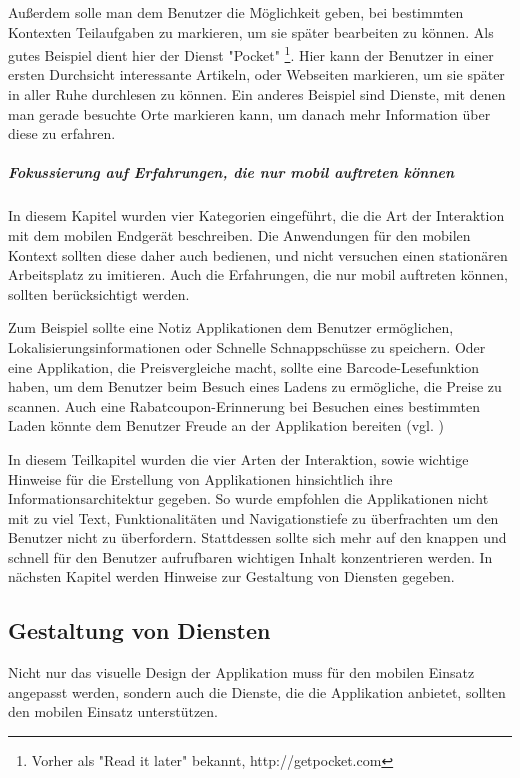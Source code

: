 Außerdem solle man dem Benutzer die Möglichkeit geben, bei bestimmten Kontexten Teilaufgaben zu markieren, um sie später bearbeiten zu können. Als gutes Beispiel dient hier der Dienst "Pocket" \footnote{Vorher als "Read it later" bekannt, http://getpocket.com }. Hier kann der Benutzer in einer ersten Durchsicht interessante Artikeln, oder Webseiten markieren, um sie später in aller Ruhe durchlesen zu können. Ein anderes Beispiel sind Dienste, mit denen man gerade besuchte Orte markieren kann, um danach mehr Information über diese zu erfahren.

\subparagraph{Fokussierung auf Erfahrungen, die nur mobil auftreten können} %
\label{subp:fokussiere_auf_erfahrungen_die_nur_mobil_auftreten_k_nnen}

In diesem Kapitel wurden vier Kategorien eingeführt, die die Art der Interaktion mit dem mobilen Endgerät beschreiben. Die Anwendungen für den mobilen Kontext sollten diese daher  auch bedienen, und nicht versuchen einen stationären Arbeitsplatz zu imitieren. Auch die Erfahrungen, die nur mobil auftreten können, sollten berücksichtigt werden. 

Zum Beispiel sollte eine Notiz Applikationen dem Benutzer ermöglichen, Lokalisierungsinformationen oder Schnelle Schnappschüsse zu speichern. Oder eine Applikation, die Preisvergleiche macht, sollte eine Barcode-Lesefunktion haben, um dem Benutzer beim Besuch eines Ladens zu ermögliche, die Preise zu scannen.  Auch eine Rabatcoupon-Erinnerung bei Besuchen eines bestimmten Laden könnte dem Benutzer Freude an der Applikation bereiten (vgl. \cite{smartOnline})
\newline

In diesem Teilkapitel wurden die vier Arten der Interaktion, sowie wichtige Hinweise für die Erstellung von Applikationen hinsichtlich ihre Informationsarchitektur gegeben. So wurde empfohlen die Applikationen nicht mit zu viel Text, Funktionalitäten und Navigationstiefe zu überfrachten um den Benutzer nicht zu überfordern. Stattdessen sollte sich mehr auf den knappen und schnell für den Benutzer aufrufbaren wichtigen Inhalt konzentrieren werden. 
In nächsten Kapitel werden Hinweise zur Gestaltung von Diensten gegeben.

\subsection{Gestaltung von Diensten}
\label{sub:gestaltung_von_diensten}

Nicht nur das visuelle Design der Applikation muss für den mobilen Einsatz angepasst werden, sondern auch die Dienste, die die Applikation anbietet, sollten den mobilen Einsatz unterstützen. 

